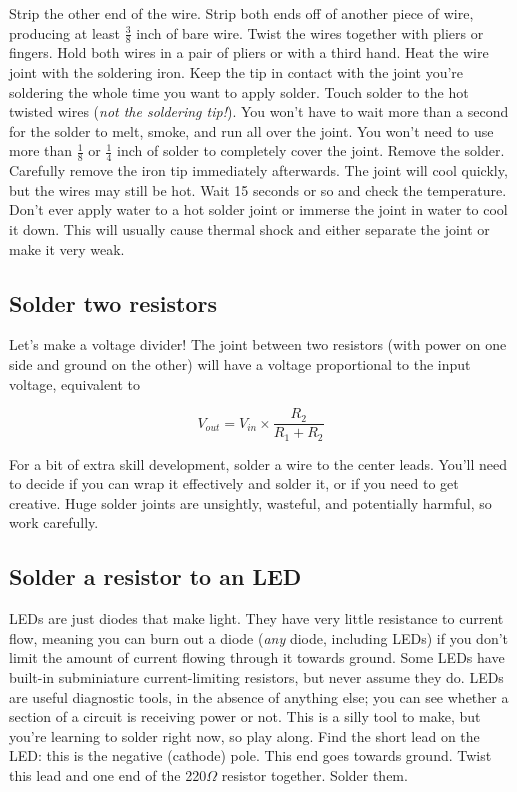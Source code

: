 \documentclass[12pt]{article}
\begin{document}
Strip the other end of the wire. Strip both ends off of another piece of wire, producing at least $\frac{3}{8}$ inch of bare wire. Twist the wires together with pliers or fingers. Hold both wires in a pair of pliers or with a third hand. Heat the wire joint with the soldering iron. Keep the tip in contact with the joint you're soldering the whole time you want to apply solder. Touch solder to the hot twisted wires (\emph{not the soldering tip!}). You won't have to wait more than a second for the solder to melt, smoke, and run all over the joint. You won't need to use more than $\frac{1}{8}$ or $\frac{1}{4}$ inch of solder to completely cover the joint. Remove the solder. Carefully remove the iron tip immediately afterwards. The joint will cool quickly, but the wires may still be hot. Wait 15 seconds or so and check the temperature. Don't ever apply water to a hot solder joint or immerse the joint in water to cool it down. This will usually cause thermal shock and either separate the joint or make it very weak.

\subsection{Solder two resistors}

Let's make a voltage divider! The joint between two resistors (with power on one side and ground on the other) will have a voltage proportional to the input voltage, equivalent to

\begin{Large}
\begin{equation*}
V_{out} = V_{in} \times \frac{R_2}{R_1 + R_2}
\end{equation*}
\end{Large}

For a bit of extra skill development, solder a wire to the center leads. You'll need to decide if you can wrap it effectively and solder it, or if you need to get creative. Huge solder joints are unsightly, wasteful, and potentially harmful, so work carefully.

\subsection{Solder a resistor to an LED}

LEDs are just diodes that make light. They have very little resistance to current flow, meaning you can burn out a diode (\emph{any} diode, including LEDs) if you don't limit the amount of current flowing through it towards ground. Some LEDs have built-in subminiature current-limiting resistors, but never assume they do. LEDs are useful diagnostic tools, in the absence of anything else; you can see whether a section of a circuit is receiving power or not. This is a silly tool to make, but you're learning to solder right now, so play along. Find the short lead on the LED: this is the negative (cathode) pole. This end goes towards ground. Twist this lead and one end of the 220$\Omega$ resistor together. Solder them. 
\end{document}
